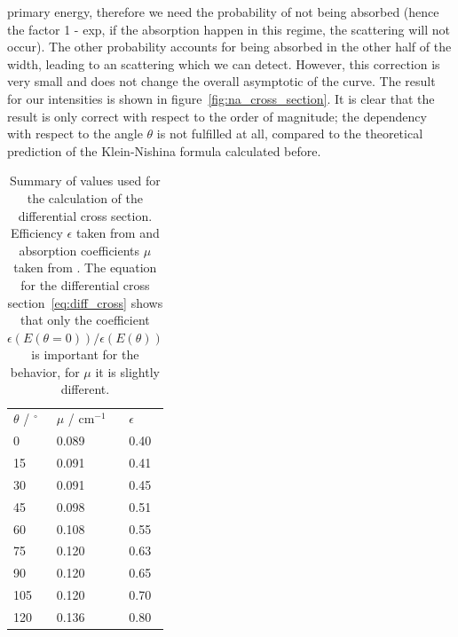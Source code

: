 primary energy, therefore we need the probability of not being absorbed (hence the factor 1 - exp, if the absorption happen 
in this regime, the scattering will not occur). The other probability accounts for being absorbed in the other half of the width,
leading to an scattering which we can detect. However, this correction is very small and does not change the overall asymptotic
of the curve. The result for our intensities is shown in figure~\ref{fig:na_cross_section}. It is clear that the result is only
correct with respect to the order of magnitude; the dependency with respect to the angle $\theta$ is not fulfilled at all, 
compared to the theoretical prediction of the Klein-Nishina formula calculated before. 

\begin{table}

\caption{Summary of values used for the calculation of the differential cross
  section. Efficiency $\epsilon$ taken from \cite{fluegge} and absorption coefficients $\mu$
  taken from \cite{ver}. The equation for the differential cross section~\eqref{eq:diff_cross} shows that only the 
  coefficient $\epsilon(E(\theta = 0) ) / \epsilon(E(\theta))$ is important for the behavior, for $\mu$ it is slightly
different. }
  \begin{tabular}{lll}
      \rowcolor{LightCyan}  $\theta$ / $^\circ$ & $\mu$ / $\mathrm{cm}^{-1}$ & $\epsilon$ \\ 
      \cellcolor{LightCyan}  0 &    0.089 & 0.40 \\ 
 \cellcolor{LightCyan}  15 &   0.091 & 0.41  \\
 \cellcolor{LightCyan}  30 &   0.091 & 0.45  \\
 \cellcolor{LightCyan}  45 &   0.098 & 0.51  \\
 \cellcolor{LightCyan}  60 &   0.108 & 0.55  \\
 \cellcolor{LightCyan}  75 &   0.120 & 0.63  \\
 \cellcolor{LightCyan}  90 &   0.120 & 0.65  \\
 \cellcolor{LightCyan}  105 &  0.120 & 0.70  \\
 \cellcolor{LightCyan}  120 &  0.136 & 0.80  
  \end{tabular}
    \label{tab:cross}
\end{table}


